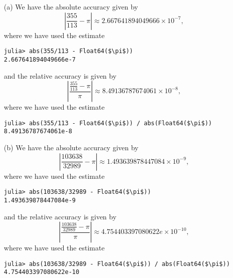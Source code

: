 
\begin{itemize}
    \item[(a)]
        We have the absolute accuracy given by
        \[
            \left \lvert \frac{355}{113} - \pi \right \vert 
            \approx 2.667641894049666 \times 10^{-7},
        \]
        where we have used the estimate
        \begin{lstlisting}
julia> abs(355/113 - Float64($\pi$))
2.667641894049666e-7
        \end{lstlisting}
        and the relative accuracy is given by
        \[
            \left \lvert \frac{\frac{355}{113} - \pi}{\pi} \right \vert 
            \approx 8.49136787674061 \times 10^{-8},
        \]
        where we have used the estimate
        \begin{lstlisting}
julia> abs(355/113 - Float64($\pi$)) / abs(Float64($\pi$))
8.49136787674061e-8
        \end{lstlisting}
    \item[(b)]
        We have the absolute accuracy given by
        \[
            \left \lvert \frac{103638}{32989} - \pi \right \vert 
            \approx 1.493639878447084 \times 10^{-9},
        \]
        where we have used the estimate
        \begin{lstlisting}
julia> abs(103638/32989 - Float64($\pi$))
1.493639878447084e-9
        \end{lstlisting}
        and the relative accuracy is given by
        \[
            \left \lvert \frac{\frac{103638}{32989} - \pi}{\pi} \right \vert 
            \approx 4.754403397080622e \times 10^{-10},
        \]
        where we have used the estimate
        \begin{lstlisting}
julia> abs(103638/32989 - Float64($\pi$)) / abs(Float64($\pi$))
4.754403397080622e-10
        \end{lstlisting}
\end{itemize}
